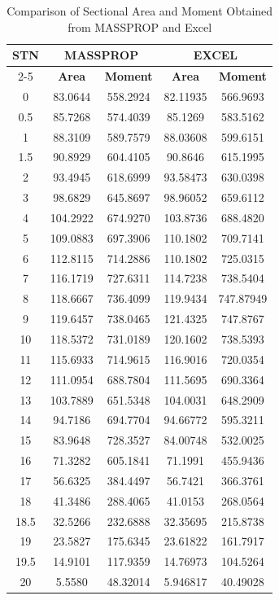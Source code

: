 \documentclass[12pt,a4paper,twoside]{report}
\begin{document}
\begin{table}[H]
\centering
\caption{Comparison of Sectional Area and Moment Obtained from MASSPROP and Excel}
\vspace{2mm}
\label{tab:massprop_excel}

\small
\setlength{\tabcolsep}{4pt}

\begin{tabular}{c c c c c}
\hline
\textbf{STN} &
\multicolumn{2}{c}{\textbf{MASSPROP}} &
\multicolumn{2}{c}{\textbf{EXCEL}} \\

\cline{2-5}

& \textbf{Area} & \textbf{Moment}
& \textbf{Area} & \textbf{Moment} \\

\hline

0    & 83.0644  & 558.2924 & 82.11935 & 566.9693 \\
0.5  & 85.7268  & 574.4039 & 85.1269  & 583.5162 \\
1    & 88.3109  & 589.7579 & 88.03608 & 599.6151 \\
1.5  & 90.8929  & 604.4105 & 90.8646  & 615.1995 \\
2    & 93.4945  & 618.6999 & 93.58473 & 630.0398 \\
3    & 98.6829  & 645.8697 & 98.96052 & 659.6112 \\
4    & 104.2922 & 674.9270 & 103.8736  & 688.4820 \\
5    & 109.0883 & 697.3906 & 110.1802  & 709.7141 \\
6    & 112.8115 & 714.2886 & 110.1802  & 725.0315 \\
7    & 116.1719 & 727.6311 & 114.7238  & 738.5404 \\
8    & 118.6667 & 736.4099 & 119.9434  & 747.87949 \\
9    & 119.6457 & 738.0465 & 121.4325  & 747.8767 \\
10   & 118.5372 & 731.0189 & 120.1602  & 738.5393 \\
11   & 115.6933 & 714.9615 & 116.9016  & 720.0354 \\
12   & 111.0954 & 688.7804 & 111.5695  & 690.3364 \\
13   & 103.7889 & 651.5348 & 104.0031  & 648.2909 \\
14   & 94.7186  & 694.7704 & 94.66772  & 595.3211 \\
15   & 83.9648  & 728.3527 & 84.00748  & 532.0025 \\
16   & 71.3282  & 605.1841 & 71.1991   & 455.9436 \\
17   & 56.6325  & 384.4497 & 56.7421   & 366.3761 \\
18   & 41.3486  & 288.4065 & 41.0153   & 268.0564 \\
18.5 & 32.5266  & 232.6888 & 32.35695  & 215.8738 \\
19   & 23.5827  & 175.6345 & 23.61822  & 161.7917 \\
19.5 & 14.9101  & 117.9359 & 14.76973  & 104.5264 \\
20   & 5.5580   & 48.32014 & 5.946817  & 40.49028 \\


\end{tabular}
\end{table}
\end{document}
